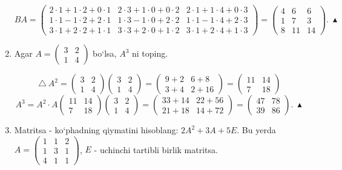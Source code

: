 \begin{enumerate}
$$BA=\begin{pmatrix}
	2\cdot1+1\cdot2+0\cdot1& 2\cdot3+1\cdot0+0\cdot2&2\cdot1+1\cdot4+0\cdot3\\
	1\cdot1-1\cdot2+2\cdot1& 1\cdot3-1\cdot0+2\cdot2&1\cdot1-1\cdot4+2\cdot3\\
	3\cdot1+2\cdot2+1\cdot1& 3\cdot3+2\cdot0+1\cdot2& 3\cdot1+2\cdot4+1\cdot3
\end{pmatrix}=\begin{pmatrix}
4&6&6\\
1&7&3\\
8&11&14
\end{pmatrix}.\ \blacktriangle$$

\item Agar $A=\begin{pmatrix}
	3&2\\1&4\end{pmatrix}$ bo`lsa, $A^3$ ni toping.

$$\triangle\ A^2=\begin{pmatrix}
	3&2\\1&4\end{pmatrix}\begin{pmatrix}
	3&2\\1&4
\end{pmatrix}=\begin{pmatrix}
9+2&6+8\\
3+4&2+16
\end{pmatrix}=\begin{pmatrix}
11&14\\
7&18
\end{pmatrix}$$
$$A^3=A^2\cdot A\begin{pmatrix}
	11&14\\7&18
\end{pmatrix}\begin{pmatrix}
3&2\\1&4
\end{pmatrix}=\begin{pmatrix}
33+14&22+56\\21+18&14+72
\end{pmatrix}=\begin{pmatrix}
47&78\\39&86
\end{pmatrix}.\ \blacktriangle$$

\item Matritsa - ko`phadning qiymatini hisoblang: $2A^2+3A+5E$. Bu yerda $A=\begin{pmatrix}
	1&1&2\\1&3&1\\4&1&1
\end{pmatrix}$, $E$ - uchinchi tartibli birlik matritsa.


\end{enumerate}
